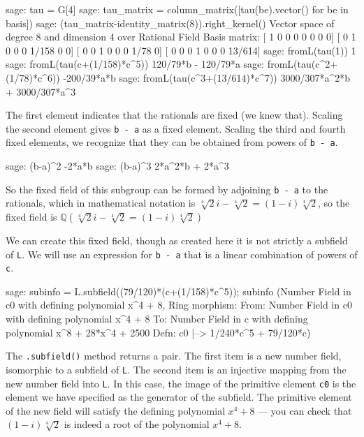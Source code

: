%
\begin{sageexample}
sage: tau = G[4]
sage: tau_matrix = column_matrix([tau(be).vector() for be in basis])
sage: (tau_matrix-identity_matrix(8)).right_kernel()
Vector space of degree 8 and dimension 4 over Rational Field
Basis matrix:
[     1      0      0      0      0      0      0      0]
[     0      1      0      0      0  1/158      0      0]
[     0      0      1      0      0      0   1/78      0]
[     0      0      0      1      0      0      0 13/614]
sage: fromL(tau(1))
1
sage: fromL(tau(c+(1/158)*c^5))
120/79*b - 120/79*a
sage: fromL(tau(c^2+(1/78)*c^6))
-200/39*a*b
sage: fromL(tau(c^3+(13/614)*c^7))
3000/307*a^2*b + 3000/307*a^3
\end{sageexample}
%
The first element indicates that the rationals are fixed (we knew that).  Scaling the second element gives \verb?b - a? as a fixed element.  Scaling the third and fourth fixed elements, we recognize that they can be obtained from powers of \verb?b - a?.
%
\begin{sageexample}
sage: (b-a)^2
-2*a*b
sage: (b-a)^3
2*a^2*b + 2*a^3
\end{sageexample}
%
So the fixed field of this subgroup can be formed by adjoining \verb?b - a? to the rationals, which in mathematical notation is
$\sqrt[4]{2}i - \sqrt[4]{2} = (1-i)\sqrt[4]{2}$, so the fixed field is ${\mathbb Q}(\sqrt[4]{2}i - \sqrt[4]{2} = (1-i)\sqrt[4]{2})$\par
%
We can create this fixed field, though as created here it is not strictly a subfield of \verb?L?.  We will use an expression for \verb?b - a? that is a linear combination of powers of \verb?c?.
%
\begin{sageexample}
sage: subinfo = L.subfield((79/120)*(c+(1/158)*c^5)); subinfo
(Number Field in c0 with defining polynomial x^4 + 8, Ring morphism:
  From: Number Field in c0 with defining polynomial x^4 + 8
  To:   Number Field in c with defining polynomial x^8 + 28*x^4 + 2500
  Defn: c0 |--> 1/240*c^5 + 79/120*c)
\end{sageexample}
%
The \verb?.subfield()? method returns a pair.  The first item is a new number field, isomorphic to a subfield of \verb?L?.  The second item is an injective mapping from the new number field into \verb?L?.  In this case, the image of the primitive element \verb?c0? is the element we have specified as the generator of the subfield.  The primitive element of the new field will satisfy the defining polynomial $x^4+8$ --- you can check that $(1-i)\sqrt[4]{2}$ is indeed a root of the polynomial $x^4 + 8$.\par
